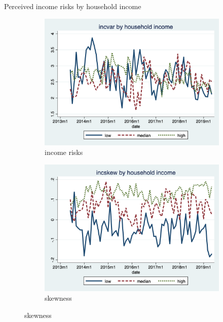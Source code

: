 \documentclass{beamer}
\begin{document}
\begin{frame}{Perceived income risks by household income}
	\begin{figure}[ht]
		\label{ts_incvar_HHinc_g_mean}
		\begin{subfigure}[b]{0.7\textwidth}
			\centering
			\caption{income risks}
			\includegraphics[width=\textwidth, height = 0.33\textheight]{figures/ts_incvar_HHinc_g_mean.png}
		\end{subfigure}
		\begin{subfigure}[b]{0.7\textwidth}
			\caption{skewness}
			\includegraphics[width=\textwidth, height = 0.33\textheight]{figures/ts_incskew_HHinc_g_mean.png}
		\end{subfigure}
	\end{figure}
\end{frame}
\end{document}
